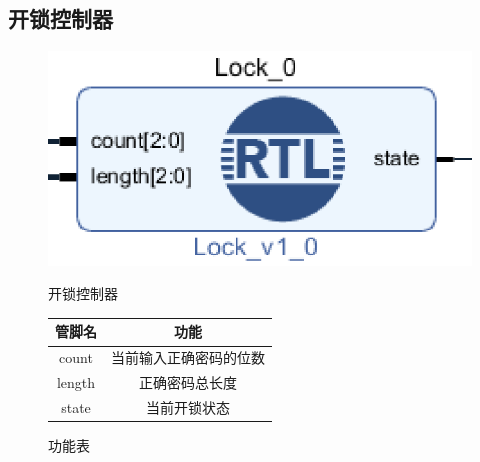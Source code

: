 \documentclass[a4paper,11pt]{ctexart}
\begin{document}
\subsection{开锁控制器}
\begin{figure}[htb]
  \begin{minipage}[b]{0.5\textwidth}
    \centering
    \includegraphics[width = \textwidth]{./images/Lock.eps}
    \caption{开锁控制器}
    \label{fig:by:table}
  \end{minipage}%
  \begin{minipage}[b]{0.5\textwidth}
    \centering
    \begin{tabular}{|c|c|} \hline
      管脚名 & 功能 \\ \hline\hline
      count     &   当前输入正确密码的位数 \\
      length    &   正确密码总长度 \\
      state     & 当前开锁状态 \\ \hline
    \end{tabular}
    \caption{功能表}
    \label{table:by:fig}
  \end{minipage}
\end{figure}
\end{document}
